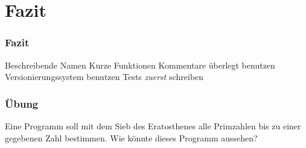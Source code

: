 \documentclass{beamer}
\begin{document}
\section{Fazit}
\begin{frame}
    \begin{tikzpicture}[overlay,
        shift={(current page.south west)},
        x = \paperwidth,
        y = \paperheight,
    ]
\end{tikzpicture}
    \frametitle{Fazit}
    \begin{outline}
        \1 Beschreibende Namen
        \1 Kurze Funktionen
        \1 Kommentare überlegt benutzen
        \1 Versionierungssystem benutzen
        \1 Tests \emph{zuerst} schreiben
    \end{outline}
    \pause
\end{frame}

\begin{frame}
    \frametitle{Übung}
    Eine Programm soll mit dem Sieb des Eratosthenes alle Primzahlen bis zu
    einer gegebenen Zahl bestimmen. Wie könnte dieses Programm aussehen?
\end{frame}
\end{document}
